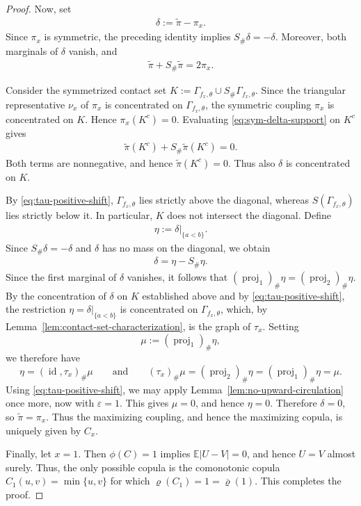 \documentclass{article}
\newcommand{\E}{\mathbb{E}}
\begin{document}
\begin{proof}
Now, set
\begin{align*}
    \delta:=\widetilde\pi-\pi_x.
\end{align*}
Since \(\pi_x\) is symmetric, the preceding identity implies \(S_\#\delta=-\delta.\) Moreover, both marginals of \(\delta\) vanish, and
\begin{align}\label{eq:sym-delta-support}
    \widetilde\pi+S_\#\widetilde\pi=2\pi_x.
\end{align}

Consider the symmetrized contact set \(K := \Gamma_{f_x,\theta} \cup S_\#\Gamma_{f_x,\theta}. \) Since the triangular representative \(\nu_x\) of \(\pi_x\) is concentrated on \(\Gamma_{f_x,\theta}\), the symmetric coupling \(\pi_x\) is concentrated on \(K\).
Hence \(\pi_x(K^c)=0\).
Evaluating \eqref{eq:sym-delta-support} on \(K^c\) gives
\begin{align*}
    \widetilde\pi(K^c)
    +
    S_\#\widetilde\pi(K^c)
    =0.
\end{align*}
Both terms are nonnegative, and hence \(\widetilde\pi(K^c)=0\).
Thus also \(\delta\) is concentrated on \(K\).

By \eqref{eq:tau-positive-shift}, \(\Gamma_{f_x,\theta}\) lies strictly above the diagonal, whereas \(S(\Gamma_{f_x,\theta})\) lies strictly below it.
In particular, \(K\) does not intersect the diagonal.
Define
\begin{align*}
    \eta:=\delta|_{\{a<b\}}.
\end{align*}
Since \(S_\#\delta=-\delta\) and \(\delta\) has no mass on the diagonal, we obtain
\begin{align*}
    \delta=\eta-S_\#\eta.
\end{align*}
Since the first marginal of \(\delta\) vanishes, it follows that \(    (\operatorname{proj}_1)_\#\eta = (\operatorname{proj}_2)_\#\eta. \) By the concentration of \(\delta\) on \(K\) established above and by \eqref{eq:tau-positive-shift}, the restriction \(\eta=\delta|_{\{a<b\}}\) is concentrated on \(\Gamma_{f_x,\theta}\), which, by Lemma~\ref{lem:contact-set-characterization}, is the graph of \(\tau_x\).
Setting
\[
    \mu:=(\operatorname{proj}_1)_\#\eta,
\]
we therefore have
\[
    \eta=(\operatorname{id},\tau_x)_\#\mu
    \qquad\text{and}\qquad
    (\tau_x)_\#\mu
    =
    (\operatorname{proj}_2)_\#\eta
    =
    (\operatorname{proj}_1)_\#\eta
    =
    \mu.
\]
Using \eqref{eq:tau-positive-shift}, we may apply Lemma~\ref{lem:no-upward-circulation} once more, now with \(\varepsilon=1\).
This gives \(\mu=0\), and hence \(\eta=0\).
Therefore \(\delta=0\), so \(\widetilde\pi=\pi_x.\) Thus the maximizing coupling, and hence the maximizing copula, is uniquely given by \(C_x\).

Finally, let \(x=1\).
Then \(\phi(C)=1\) implies \(\E|U-V|=0\), and hence \(U=V\) almost surely.
Thus, the only possible copula is the comonotonic copula \(C_1(u,v)=\min\{u,v\}\) for which \(\varrho(C_1)=1=\overline{\varrho}(1).\) This completes the proof.
\end{proof}
\end{document}
